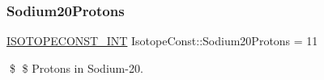 \subsubsection{\texorpdfstring{Sodium20\+Protons}{Sodium20Protons}}
{\footnotesize\ttfamily \mbox{\hyperlink{group___isotope_const-_macros_ga5f18360b3e99483a35c32d789e62621c}{I\+S\+O\+T\+O\+P\+E\+C\+O\+N\+S\+T\+\_\+\+I\+NT}} Isotope\+Const\+::\+Sodium20\+Protons = 11}

\$ \$ Protons in Sodium-\/20. 